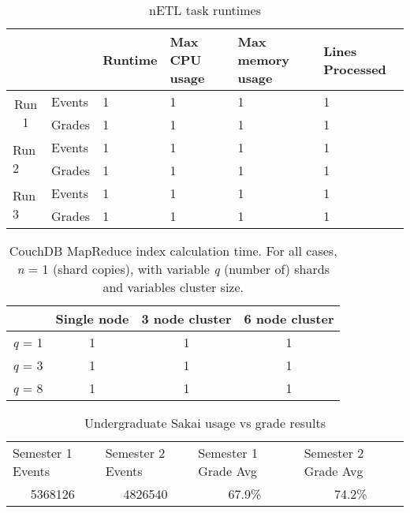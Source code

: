 \begin{table}[]
    \centering
    \caption{nETL task runtimes}
    \label{netl-runtimes}
    \begin{tabular}{llllll}
                                                   &        & Runtime & Max CPU usage & Max memory usage & Lines Processed \\ \hline
        \multicolumn{1}{c}{\multirow{2}{*}{Run 1}} & Events & 1       & 1             & 1                & 1               \\
        \multicolumn{1}{c}{}                       & Grades & 1       & 1             & 1                & 1               \\
        \multirow{2}{*}{Run 2}                     & Events & 1       & 1             & 1                & 1               \\
                                                   & Grades & 1       & 1             & 1                & 1               \\
        \multirow{2}{*}{Run 3}                     & Events & 1       & 1             & 1                & 1               \\
                                                   & Grades & 1       & 1             & 1                & 1               \\ \hline
    \end{tabular}
\end{table}

\begin{table}[]
    \centering
    \caption{CouchDB MapReduce index calculation time. For all cases, \textit{n} = 1 (shard copies), with variable \textit{q} (number of) shards and variables cluster size.}
    \label{couch-indexing}
    \begin{tabular}{cccc}
                       & Single node & 3 node cluster & 6 node cluster \\ \hline
        \textit{q} = 1 & 1           & 1              & 1              \\
        \textit{q} = 3 & 1           & 1              & 1              \\
        \textit{q} = 8 & 1           & 1              & 1              \\ \hline
    \end{tabular}
\end{table}

\begin{table}[]
    \centering
    \caption{Undergraduate Sakai usage vs grade results}
    \label{sakai-grades-and-events}
    \begin{tabular}{llll}
        Semester 1 Events           & Semester 2 Events           & Semester 1 Grade Avg       & Semester 2 Grade Avg       \\
        \multicolumn{1}{c}{5368126} & \multicolumn{1}{c}{4826540} & \multicolumn{1}{c}{67.9\%} & \multicolumn{1}{c}{74.2\%}
    \end{tabular}
\end{table}